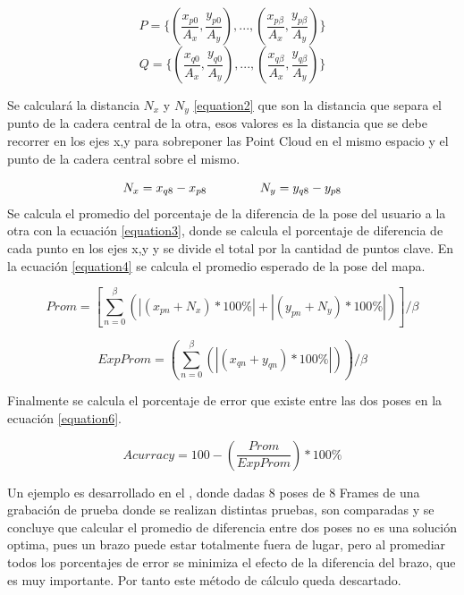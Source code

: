 \begin{equation}
P=\{(\frac{x_{p0}}{A_x},\frac{y_{p0}}{A_y}),...,(\frac{x_{p\beta}}{A_x},\frac{y_{p\beta}}{A_y})\}
\label{equation1.1}
\end{equation}
\begin{equation}
Q=\{(\frac{x_{q0}}{A_x},\frac{y_{q0}}{A_y}),...,(\frac{x_{q\beta}}{A_x},\frac{y_{q\beta}}{A_y})\}
\label{equation1.2}
\end{equation}

Se calculará la distancia $N_x$ y $N_y$ \ref{equation2} que son la distancia que separa el punto de la cadera central de la otra, esos valores es la distancia que se debe recorrer en los ejes x,y para sobreponer las Point Cloud en el mismo espacio y el punto de la cadera central sobre el mismo.

\begin{equation}
N_x= x_{q8}-x_{p8} \hspace{15mm} N_y= y_{q8}-y_{p8}
\label{equation2}
\end{equation}
Se calcula el promedio del porcentaje de la diferencia de la pose del usuario a la otra con la ecuación \ref{equation3}, donde se calcula el porcentaje de diferencia de cada punto en los ejes x,y y se divide el total por la cantidad de puntos clave. En la ecuación \ref{equation4} se calcula el promedio esperado de la pose del mapa.

\begin{equation}
Prom = [\sum_{n=0}^\beta (\left | (x_{pn}+N_x)*100\% \right |  +  \left |  (y_{pn}+N_y)*100\%  \right |) ]/\beta
\label{equation3}
\end{equation}

\begin{equation}
ExpProm = (\sum_{n=0}^\beta (\left | (x_{qn}+y_{qn})*100\% \right |))/\beta
\label{equation4}
\end{equation}

Finalmente se calcula el porcentaje de error que existe entre las dos poses en la ecuación \ref{equation6}. 

\begin{equation}
Acurracy = 100 - (\frac{Prom}{ExpProm})*100 \%
\label{equation6}
\end{equation}



Un ejemplo es desarrollado en el , donde dadas 8 poses de 8 Frames de una grabación de prueba donde se realizan distintas pruebas, son comparadas y se concluye que calcular el promedio de diferencia entre dos poses no es una solución optima, pues un brazo puede estar totalmente fuera de lugar, pero al promediar todos los porcentajes de error se minimiza el efecto de la diferencia del brazo, que es muy importante. Por tanto este método de cálculo queda descartado.


